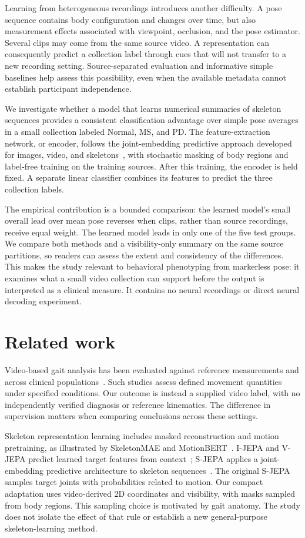 \documentclass[10pt,twocolumn,letterpaper]{article}
\begin{document}
Learning from heterogeneous recordings introduces another difficulty. A pose sequence contains body configuration and changes over time, but also measurement effects associated with viewpoint, occlusion, and the pose estimator. Several clips may come from the same source video. A representation can consequently predict a collection label through cues that will not transfer to a new recording setting. Source-separated evaluation and informative simple baselines help assess this possibility, even when the available metadata cannot establish participant independence.

We investigate whether a model that learns numerical summaries of skeleton sequences provides a consistent classification advantage over simple pose averages in a small collection labeled Normal, MS, and PD. The feature-extraction network, or encoder, follows the joint-embedding predictive approach developed for images, video, and skeletons~\cite{ijepa,vjepa,sjepa}, with stochastic masking of body regions and label-free training on the training sources. After this training, the encoder is held fixed. A separate linear classifier combines its features to predict the three collection labels.

The empirical contribution is a bounded comparison: the learned model's small overall lead over mean pose reverses when clips, rather than source recordings, receive equal weight. The learned model leads in only one of the five test groups. We compare both methods and a visibility-only summary on the same source partitions, so readers can assess the extent and consistency of the differences. This makes the study relevant to behavioral phenotyping from markerless pose: it examines what a small video collection can support before the output is interpreted as a clinical measure. It contains no neural recordings or direct neural decoding experiment.

\section{Related work}
Video-based gait analysis has been evaluated against reference measurements and across clinical populations~\cite{stenum2021,stenum2024}. Such studies assess defined movement quantities under specified conditions. Our outcome is instead a supplied video label, with no independently verified diagnosis or reference kinematics. The difference in supervision matters when comparing conclusions across these settings.

Skeleton representation learning includes masked reconstruction and motion pretraining, as illustrated by SkeletonMAE and MotionBERT~\cite{skeletonmae,motionbert}. I-JEPA and V-JEPA predict learned target features from context~\cite{ijepa,vjepa}; S-JEPA applies a joint-embedding predictive architecture to skeleton sequences~\cite{sjepa}. The original S-JEPA samples target joints with probabilities related to motion. Our compact adaptation uses video-derived 2D coordinates and visibility, with masks sampled from body regions. This sampling choice is motivated by gait anatomy. The study does not isolate the effect of that rule or establish a new general-purpose skeleton-learning method.
\end{document}
